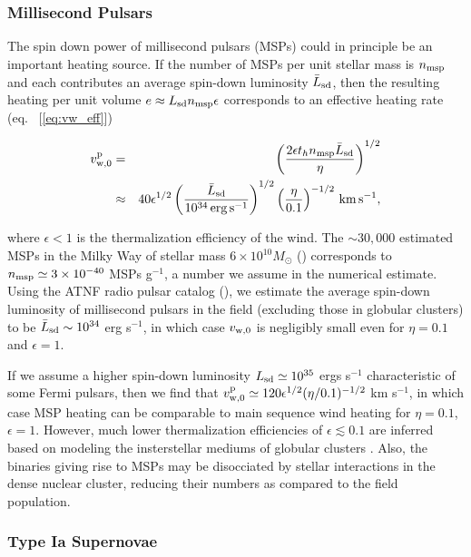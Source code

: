 \documentclass[usenatbib,fleqn]{mn2e}
\begin{document}
\subsubsection{Millisecond Pulsars} The spin down power of millisecond
pulsars (MSPs) could in principle be an important heating source.  If
the number of MSPs per unit stellar mass is $n_{\rm msp}$ and each
contributes an average spin-down luminosity $\bar{L}_{\rm sd}$, then the
resulting heating per unit volume $e \approx L_{\rm sd}n_{\rm
  msp}\epsilon$ corresponds to an effective heating rate (eq.~
[\ref{eq:vw_eff}])

  \begin{align}
    v_{\rm w,0}^{\rm p} &=&\left({\frac{2\epsilon t_h n_{\rm msp} \bar{L}_{\rm sd}}{\eta}}\right)^{1/2} \nonumber \\
&\approx&  40\epsilon^{1/2}\left(\frac{\bar{L}_{\rm sd}}{10^{34}\,{\rm erg\,s^{-1}}}\right)^{1/2} \left(\frac{\eta}{0.1}\right)^{-1/2}\,{\rm km\,s^{-1}},
  \end{align}

where $\epsilon< 1$ is the thermalization efficiency of the wind.  The $\sim 30,000$ estimated MSPs in the Milky Way of stellar mass $6\times 10^{10}M_{\odot}$ (\citealt{Lorimer13}) corresponds to $n_{\rm msp}\simeq3 \times 10^{-40} $ MSPs g$^{-1}$, a number we assume in the numerical estimate.  Using the ATNF radio pulsar catalog (\citealt{Manchester+05}), we estimate the average spin-down luminosity of millisecond pulsars in the field (excluding those in globular clusters) to be $\bar{L}_{\rm sd} \sim 10^{34}$ erg s$^{-1}$, in which case $v_{\rm w,0}$ is negligibly small even for $\eta = 0.1$ and $\epsilon = 1$.  

If we assume a higher spin-down luminosity $L_{\rm sd}\simeq 10^{35}$ ergs s$^{-1}$ characteristic of some Fermi pulsars, then we find that $v_{\rm w,0}^{\rm p} \simeq 120\epsilon^{1/2} (\eta/0.1)^{-1/2}$ km s$^{-1}$, in which case MSP heating can be comparable to main sequence wind heating for $\eta = 0.1$, $\epsilon = 1$.  However, much lower thermalization efficiencies of $\epsilon \lesssim 0.1$ are inferred based on modeling the insterstellar mediums of globular clusters \citep{NaimanSoares-Furtado+:2013a}.  Also, the binaries giving rise to MSPs may be disocciated by stellar interactions in the dense nuclear cluster, reducing their numbers as compared to the field population.    
\subsubsection{Type Ia Supernovae} 
\end{document}
